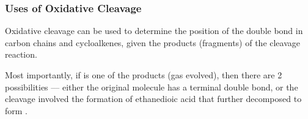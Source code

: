 
		\subsubsection{Uses of Oxidative Cleavage}

			Oxidative cleavage can be used to determine the position of the double bond in carbon chains and cycloalkenes,
			given the products (fragments) of the cleavage reaction.

			Most importantly, if  is one of the products (gas evolved), then there are 2 possibilities –– either the original
			molecule has a terminal  double bond, or the cleavage involved the formation of ethanedioic acid that further
			decomposed to form .






























